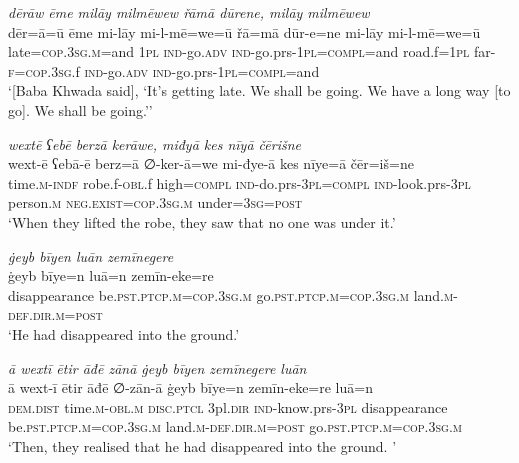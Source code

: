 \ea \label{BP.191}
\textit{dērāw ēme milāy milmēwew řāmā dūrene, milāy milmēwew} \\ 
\gll dēr=ā=ū ēme mi-lāy mi-l-mē=we=ū řā=mā dūr-e=ne mi-lāy mi-l-mē=we=ū \\ 
 late\textsc{=cop}\textsc{.3sg}\textsc{.m}=and \textsc{1pl} \textsc{ind-}go\textsc{.adv} \textsc{ind-}go.prs\textsc{-\textsc{1pl}}\textsc{=compl}=and road.f\textsc{=\textsc{1pl}} far\textsc{-f}\textsc{=cop}\textsc{.3sg}.f \textsc{ind-}go\textsc{.adv} \textsc{ind-}go.prs\textsc{-\textsc{1pl}}\textsc{=compl}=and \\ 
\glt `[Baba Khwada said], ‘It’s getting late. We shall be going. We have a long way [to go]. We shall be going.’'
\z 
 
\ea \label{BP.194}
\textit{wextē ʕebē berzā kerāwe, miđyā kes nīyā čērišne} \\ 
\gll wext-ē ʕebā-ē berz=ā ∅-ker-ā=we mi-đye-ā kes nīye=ā čēr=iš=ne \\ 
 time\textsc{.m}\textsc{-indf} robe.f\textsc{-obl}.f high\textsc{=compl} \textsc{ind-}do.prs\textsc{-3pl}\textsc{=compl} \textsc{ind-}look.prs\textsc{-3pl} person\textsc{.m} \textsc{\textsc{neg.}exist}\textsc{=cop}\textsc{.3sg}\textsc{.m} under\textsc{=3sg}\textsc{=\textsc{post}} \\ 
\glt `When they lifted the robe, they saw that no one was under it.'
\z 
 
\ea \label{BP.196}
\textit{ġeyb bīyen luān zemīnegere} \\ 
\gll ġeyb bīye=n luā=n zemīn-eke=re \\ 
 disappearance be\textsc{.pst}\textsc{.ptcp}\textsc{.m}\textsc{=cop}\textsc{.3sg}\textsc{.m} go\textsc{.pst}\textsc{.ptcp}\textsc{.m}\textsc{=cop}\textsc{.3sg}\textsc{.m} land\textsc{.m}\textsc{-def}\textsc{.dir}\textsc{.m}\textsc{=\textsc{post}} \\ 
\glt `He had disappeared into the ground.'
\z 
 
\ea \label{BP.197}
\textit{ā wextī ētir āđē zānā ġeyb bīyen zemīnegere luān} \\ 
\gll ā wext-ī ētir āđē ∅-zān-ā ġeyb bīye=n zemīn-eke=re luā=n \\ 
 \textsc{dem.dist} time\textsc{.m}\textsc{-obl}\textsc{.m} \textsc{disc.ptcl} 3pl\textsc{.dir} \textsc{ind-}know.prs\textsc{-3pl} disappearance be\textsc{.pst}\textsc{.ptcp}\textsc{.m}\textsc{=cop}\textsc{.3sg}\textsc{.m} land\textsc{.m}\textsc{-def}\textsc{.dir}\textsc{.m}\textsc{=\textsc{post}} go\textsc{.pst}\textsc{.ptcp}\textsc{.m}\textsc{=cop}\textsc{.3sg}\textsc{.m} \\ 
\glt `Then, they realised that he had disappeared into the ground. '
\z 
 
